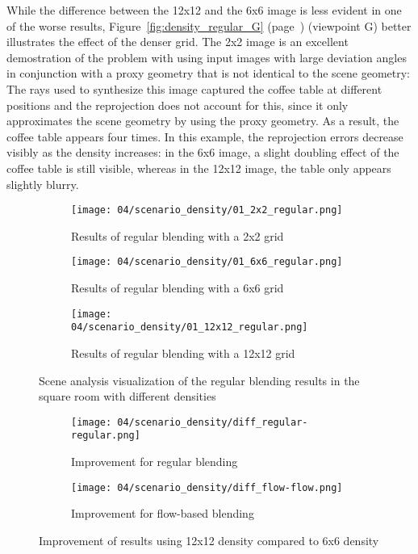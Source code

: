 While the difference between the 12x12 and the 6x6 image is less evident in one of the worse results, Figure~\ref{fig:density_regular_G} (page~\pageref{fig:density_regular_G}) (viewpoint G) better illustrates the effect of the denser grid. The 2x2 image is an excellent demostration of the problem with using input images with large deviation angles in conjunction with a proxy geometry that is not identical to the scene geometry: The rays used to synthesize this image captured the coffee table at different positions and the reprojection does not account for this, since it only approximates the scene geometry by using the proxy geometry. As a result, the coffee table appears four times. In this example, the reprojection errors decrease visibly as the density increases: in the 6x6 image, a slight doubling effect of the coffee table is still visible, whereas in the 12x12 image, the table only appears slightly blurry.

\begin{figure}
\centering
    \hfill
    \begin{subfigure}[b]{0.32\textwidth}
            \centering
            \texttt{[image: 04/scenario\_density/01\_2x2\_regular.png]}
            \caption{Results of regular blending with a 2x2 grid}
    \end{subfigure}
    \hfill
    \begin{subfigure}[b]{0.32\textwidth}
            \centering
            \texttt{[image: 04/scenario\_density/01\_6x6\_regular.png]}
            \caption{Results of regular blending with a 6x6 grid}
    \end{subfigure}
    \hfill
    \begin{subfigure}[b]{0.32\textwidth}
            \centering
            \texttt{[image: 04/scenario\_density/01\_12x12\_regular.png]}
            \caption{Results of regular blending with a 12x12 grid}
    \end{subfigure}
    \hfill
  \caption{Scene analysis visualization of the regular blending results in the square room with different densities} \label{fig:density_regular_scene_analysis}
\end{figure}

\begin{figure}
\centering
    \hfill
    \begin{subfigure}[b]{0.45\textwidth}
            \centering
            \texttt{[image: 04/scenario\_density/diff\_regular-regular.png]}
            \caption{Improvement for regular blending}
    \end{subfigure}
    \hfill
    \begin{subfigure}[b]{0.45\textwidth}
            \centering
            \texttt{[image: 04/scenario\_density/diff\_flow-flow.png]}
            \caption{Improvement for flow-based blending}
    \end{subfigure}
    \hfill
  \caption{Improvement of results using 12x12 density compared to 6x6 density} \label{fig:dens_diff_6x6_12x12}
\end{figure}


